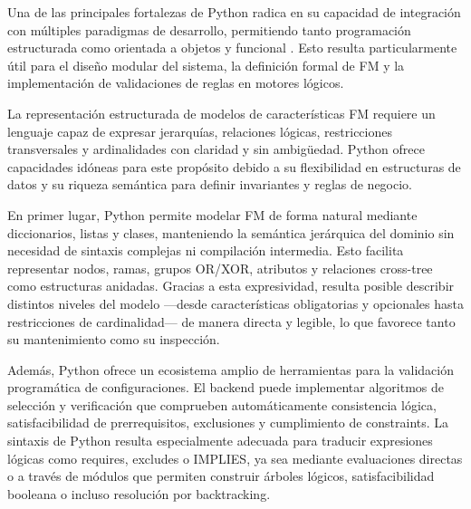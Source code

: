 {{        Una de las principales fortalezas de Python radica en su capacidad de integración 
        con múltiples paradigmas de desarrollo, permitiendo tanto programación estructurada 
        como orientada a objetos y funcional \citep{lutz2013learning}. Esto resulta particularmente 
        útil para el diseño modular del sistema, la definición formal de \ac{FM} y la implementación 
        de validaciones de reglas en motores lógicos.

        La representación estructurada de modelos de características \ac{FM} requiere un lenguaje 
        capaz de expresar jerarquías, relaciones lógicas, restricciones transversales y 
        ardinalidades con claridad y sin ambigüedad. Python ofrece capacidades idóneas para 
        este propósito debido a su flexibilidad en estructuras de datos y su riqueza semántica 
        para definir invariantes y reglas de negocio.

        En primer lugar, Python permite modelar FM de forma natural mediante diccionarios, 
        listas y clases, manteniendo la semántica jerárquica del dominio sin necesidad de 
        sintaxis complejas ni compilación intermedia. Esto facilita representar nodos, ramas, 
        grupos OR/XOR, atributos y relaciones cross-tree como estructuras anidadas. Gracias a 
        esta expresividad, resulta posible describir distintos niveles del modelo —desde 
        características obligatorias y opcionales hasta restricciones de cardinalidad— de manera 
        directa y legible, lo que favorece tanto su mantenimiento como su inspección.

        Además, Python ofrece un ecosistema amplio de herramientas para la validación 
        programática de configuraciones. El backend puede implementar algoritmos de selección y 
        verificación que comprueben automáticamente consistencia lógica, satisfacibilidad de 
        prerrequisitos, exclusiones y cumplimiento de constraints. La sintaxis de Python resulta 
        especialmente adecuada para traducir expresiones lógicas como requires, excludes o 
        IMPLIES, ya sea mediante evaluaciones directas o a través de módulos que permiten 
        construir árboles lógicos, satisfacibilidad booleana o incluso resolución por backtracking.

}}
